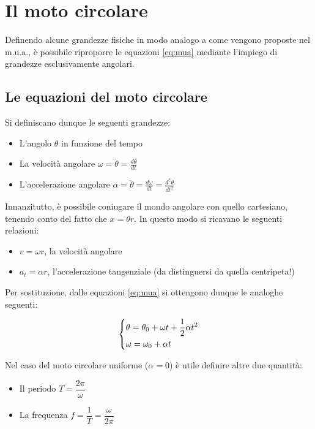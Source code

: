 \documentclass[oneside]{book}
\begin{document}
\section{Il moto circolare}

Definendo alcune grandezze fisiche in modo analogo a come vengono
proposte nel m.u.a., è possibile riproporre le equazioni \ref{eq:mua}
mediante l'impiego di grandezze esclusivamente angolari.

\subsection{Le equazioni del moto circolare}

Si definiscano dunque le seguenti grandezze:

\begin{itemize}
    \item L'angolo $\theta$ in funzione del tempo
    \item La velocità angolare $\displaystyle \omega=\dot{\theta}=\frac{d\theta}{dt}$
    \item L'accelerazione angolare $\displaystyle \alpha=\ddot{\theta}=\frac{d\omega}{dt}=\frac{d^2\theta}{dt^2}$
\end{itemize}

Innanzitutto, è possibile coniugare il mondo angolare con quello
cartesiano, tenendo conto del fatto che $x=\theta r$. In questo modo
si ricavano le seguenti relazioni:

\begin{itemize}
    \item $\displaystyle v=\omega r$, la velocità angolare
    \item $\displaystyle a_t=\alpha r$, l'accelerazione tangenziale
    (da distinguersi da quella centripeta!)
\end{itemize}

Per sostituzione, dalle equazioni \ref{eq:mua} si ottengono dunque
le analoghe seguenti:

\begin{equation}
    \begin{dcases}
        \theta = \theta_0 + \omega t + \frac12 \alpha t^2 \\
        \omega = \omega_0 + \alpha t
    \end{dcases}
\end{equation}

Nel caso del moto circolare uniforme ($\alpha=0$) è utile definire
altre due quantità:

\begin{itemize}
    \item Il periodo $T=\dfrac{2\pi}{\omega}$
    \item La frequenza $f=\dfrac{1}{T}=\dfrac{\omega}{2\pi}$
\end{itemize}
\end{document}

